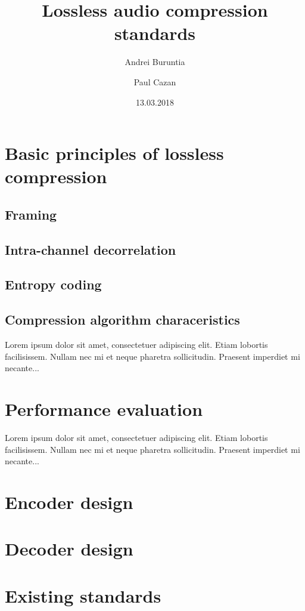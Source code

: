 \documentclass{article}
\title{Lossless audio compression standards}
\author{Andrei Buruntia\\
	\and
	Paul Cazan}
\date{13.03.2018 }
\begin{document}
 
\maketitle
 
\tableofcontents
  
\section{ Basic principles of lossless compression}
\subsection{Framing}
\subsection{Intra-channel decorrelation}
\subsection{Entropy coding}
\subsection{Compression algorithm characeristics}

Lorem ipsum dolor sit amet, consectetuer adipiscing elit.  
Etiam lobortis facilisissem.  Nullam nec mi et neque pharetra 
sollicitudin.  Praesent imperdiet mi necante...

\section{Performance evaluation}
 
Lorem ipsum dolor sit amet, consectetuer adipiscing elit.  
Etiam lobortis facilisissem.  Nullam nec mi et neque pharetra 
sollicitudin.  Praesent imperdiet mi necante...

\section{Encoder design}

\section{Decoder design}

\section{Existing standards}
\end{document}
